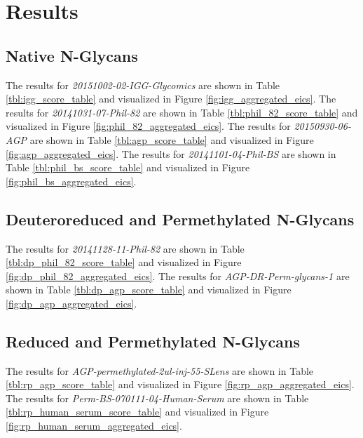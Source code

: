 \section{Results}

\subsection{Native N-Glycans}
    The results for \textit{20151002-02-IGG-Glycomics} are shown in Table
    \ref{tbl:igg_score_table} and visualized in Figure \ref{fig:igg_aggregated_eics}.
    The results for \textit{20141031-07-Phil-82} are shown in Table \ref{tbl:phil_82_score_table}
    and visualized in Figure \ref{fig:phil_82_aggregated_eics}. The results for \textit{20150930-06-AGP}
    are shown in Table \ref{tbl:agp_score_table} and visualized in Figure \ref{fig:agp_aggregated_eics}.
    The results for \textit{20141101-04-Phil-BS} are shown in Table \ref{tbl:phil_bs_score_table} and
    visualized in Figure \ref{fig:phil_bs_aggregated_eics}.

    
    
    
    


\subsection{Deuteroreduced and Permethylated N-Glycans}
    The results for \textit{20141128-11-Phil-82} are shown in Table \ref{tbl:dp_phil_82_score_table}
    and visualized in Figure \ref{fig:dp_phil_82_aggregated_eics}. The results for \textit{AGP-DR-Perm-glycans-1}
    are shown in Table \ref{tbl:dp_agp_score_table} and visualized in Figure \ref{fig:dp_agp_aggregated_eics}.

    
    


\subsection{Reduced and Permethylated N-Glycans}
    The results for \textit{AGP-permethylated-2ul-inj-55-SLens} are shown in Table \ref{tbl:rp_agp_score_table}
    and visualized in Figure \ref{fig:rp_agp_aggregated_eics}. The results for \textit{Perm-BS-070111-04-Human-Serum}
    are shown in Table \ref{tbl:rp_human_serum_score_table} and visualized in Figure \ref{fig:rp_human_serum_aggregated_eics}.

    
    
